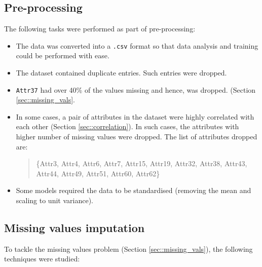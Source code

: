 \documentclass[11pt,a4paper]{article}
\begin{document}
\subsection{Pre-processing}
\label{sec::pipe_preprocessing}
The following tasks were performed as part of pre-processing:
\begin{itemize}
    \item The data was converted into a \texttt{.csv} format so that data analysis and training could be performed with ease.
    \item The dataset contained duplicate entries. Such entries were dropped.
    \item \texttt{Attr37} had over 40\% of the values missing and hence, was dropped. (Section \ref{sec::missing_vals}.
    \item In some cases, a pair of attributes in the dataset were highly correlated with each other (Section \ref{sec::correlation}). In such cases, the attributes with higher number of missing values were dropped. The list of attributes dropped are:
    \begin{quote}
        \{Attr3, Attr4, Attr6, Attr7, Attr15, Attr19, Attr32, Attr38, Attr43, Attr44, Attr49, Attr51, Attr60, Attr62\}
    \end{quote}
    \item Some models required the data to be standardised (removing the mean and scaling to unit variance).
\end{itemize}


\subsection{Missing values imputation}
\label{sec::pipe_missing_vals}
To tackle the missing values problem (Section \ref{sec::missing_vals}), the following techniques were studied:
\end{document}
